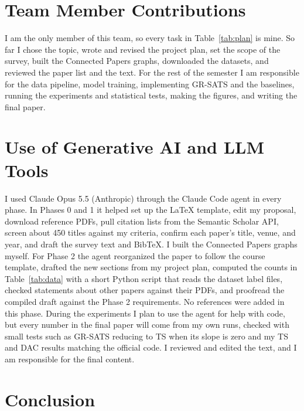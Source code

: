 \documentclass[sigconf,nonacm]{acmart}
\begin{document}
\section{Team Member Contributions}

I am the only member of this team, so every task in Table~\ref{tab:plan} is mine. So far I chose the topic, wrote and revised the project plan, set the scope of the survey, built the Connected Papers graphs, downloaded the datasets, and reviewed the paper list and the text. For the rest of the semester I am responsible for the data pipeline, model training, implementing GR-SATS and the baselines, running the experiments and statistical tests, making the figures, and writing the final paper.

\section{Use of Generative AI and LLM Tools}
\label{sec:llm}

I used Claude Opus 5.5 (Anthropic) through the Claude Code agent in every phase. In Phases 0 and 1 it helped set up the LaTeX template, edit my proposal, download reference PDFs, pull citation lists from the Semantic Scholar API, screen about 450 titles against my criteria, confirm each paper's title, venue, and year, and draft the survey text and BibTeX. I built the Connected Papers graphs myself. For Phase 2 the agent reorganized the paper to follow the course template, drafted the new sections from my project plan, computed the counts in Table~\ref{tab:data} with a short Python script that reads the dataset label files, checked statements about other papers against their PDFs, and proofread the compiled draft against the Phase 2 requirements. No references were added in this phase. During the experiments I plan to use the agent for help with code, but every number in the final paper will come from my own runs, checked with small tests such as GR-SATS reducing to TS when its slope is zero and my TS and DAC results matching the official code. I reviewed and edited the text, and I am responsible for the final content.

\section{Conclusion}
\end{document}
